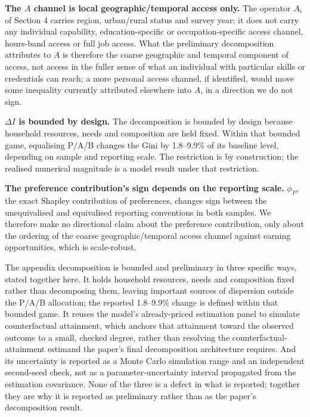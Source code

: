 \documentclass[11pt,a4paper]{article}
\begin{document}
\textbf{The \(A\) channel is local geographic/temporal access only.} The operator \(A_i\) of Section 4 carries region, urban/rural status and survey year; it does not carry any individual capability, education-specific or occupation-specific access channel, hours-band access or full job access. What the preliminary decomposition attributes to \(A\) is therefore the coarse geographic and temporal component of access, not access in the fuller sense of what an individual with particular skills or credentials can reach; a more personal access channel, if identified, would move some inequality currently attributed elsewhere into \(A\), in a direction we do not sign.

\textbf{\(\Delta I\) is bounded by design.} The decomposition is bounded by design because household resources, needs and composition are held fixed. Within that bounded game, equalising P/A/B changes the Gini by 1.8--9.9\% of its baseline level, depending on sample and reporting scale. The restriction is by construction; the realised numerical magnitude is a model result under that restriction.

\textbf{The preference contribution's sign depends on the reporting scale.} \(\phi_P\), the exact Shapley contribution of preferences, changes sign between the unequivalised and equivalised reporting conventions in both samples. We therefore make no directional claim about the preference contribution, only about the ordering of the coarse geographic/temporal access channel against earning opportunities, which is scale-robust.

The appendix decomposition is bounded and preliminary in three specific ways, stated together here. It holds household resources, needs and composition fixed rather than decomposing them, leaving important sources of dispersion outside the P/A/B allocation; the reported 1.8--9.9\% change is defined within that bounded game. It reuses the model's already-priced estimation panel to simulate counterfactual attainment, which anchors that attainment toward the observed outcome to a small, checked degree, rather than resolving the counterfactual-attainment estimand the paper's final decomposition architecture requires. And its uncertainty is reported as a Monte Carlo simulation range and an independent second-seed check, not as a parameter-uncertainty interval propagated from the estimation covariance. None of the three is a defect in what is reported; together they are why it is reported as preliminary rather than as the paper's decomposition result.
\end{document}
